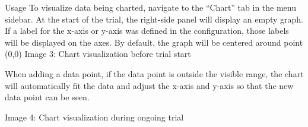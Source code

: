 Usage
To visualize data being charted, navigate to the ``Chart” tab in the menu sidebar. At the start of the trial, the right-side panel will display an empty graph. If a label for the x-axis or y-axis was defined in the configuration, those labels will be displayed on the axes.  By default, the graph will be centered around point (0,0)
Image 3: Chart visualization before trial start

When adding a data point, if the data point is outside the visible range, the chart will automatically fit the data and adjust the x-axis and y-axis so that the new data point can be seen.


Image 4: Chart visualization during ongoing trial
